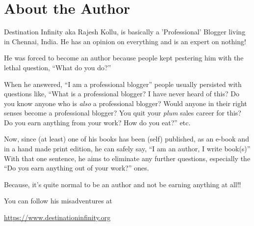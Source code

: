 \chapter*{About the Author}

Destination Infinity aka Rajesh Kollu, is basically a 'Professional' Blogger
living in Chennai, India. He has an opinion on everything and is an expert on
nothing!

He was forced to become an author because people kept pestering him with the
lethal question, “What do you do?”

When he answered, “I am a professional blogger” people usually persisted with
questions like, “What is a professional blogger? I have never heard of this? Do
you know anyone who is \emph{also} a professional blogger? Would anyone in their
right senses become a professional blogger? You quit your \emph{plum} sales
career for this? Do you earn anything from your work? How do you eat?” etc.

Now, since (at least) one of his books has been (self) published, as an e-book
and in a hand made print edition, he can safely say, “I am an author, I write
book(s)” With that one sentence, he aims to eliminate any further questions,
especially the “Do you earn anything out of your work?” ones.

Because, it's quite normal to be an author and not be earning anything at all!!
\faGrinBeam[regular]

You can follow his misadventures at

\vspace{1ex}

\centerline{\url{https://www.destinationinfinity.org}}

\chapter{}

